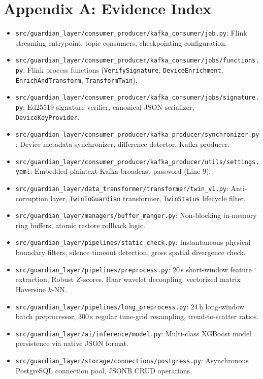 \documentclass[10pt,a4paper]{report}
\begin{document}
\section{Appendix A: Evidence Index}
\begin{itemize}[leftmargin=*]
  \item \texttt{src/guardian\_layer/consumer\_producer/kafka\_consumer/job.py}: Flink streaming entrypoint, topic consumers, checkpointing configuration.
  \item \texttt{src/guardian\_layer/consumer\_producer/kafka\_consumer/jobs/functions.py}: Flink process functions (\texttt{VerifySignature}, \texttt{DeviceEnrichment}, \texttt{EnrichAndTransform}, \texttt{TransformTwin}).
  \item \texttt{src/guardian\_layer/consumer\_producer/kafka\_consumer/jobs/signature.py}: Ed25519 signature verifier, canonical JSON serializer, \texttt{DeviceKeyProvider}.
  \item \texttt{src/guardian\_layer/consumer\_producer/kafka\_producer/synchronizer.py}: Device metadata synchronizer, difference detector, Kafka producer.
  \item \texttt{src/guardian\_layer/consumer\_producer/kafka\_producer/utils/settings.yaml}: Embedded plaintext Kafka broadcast password (Line 9).
  \item \texttt{src/guardian\_layer/data\_transformer/transformer/twin\_v1.py}: Anti-corruption layer, \texttt{TwinToGuardian} transformer, \texttt{TwinStatus} lifecycle filter.
  \item \texttt{src/guardian\_layer/managers/buffer\_manger.py}: Non-blocking in-memory ring buffers, atomic restore rollback logic.
  \item \texttt{src/guardian\_layer/pipelines/static\_check.py}: Instantaneous physical boundary filters, silence timeout detection, gross spatial divergence check.
  \item \texttt{src/guardian\_layer/pipelines/preprocess.py}: 20\,s short-window feature extraction, Robust $Z$-scores, Haar wavelet decoupling, vectorized matrix Haversine $k$-NN.
  \item \texttt{src/guardian\_layer/pipelines/long\_preprocess.py}: 24\,h long-window batch preprocessor, 300\,s regular time-grid resampling, trend-to-scatter ratios.
  \item \texttt{src/guardian\_layer/ai/inference/model.py}: Multi-class XGBoost model persistence via native JSON format.
  \item \texttt{src/guardian\_layer/storage/connections/postgress.py}: Asynchronous PostgreSQL connection pool, JSONB CRUD operations.

\end{itemize}
\end{document}
